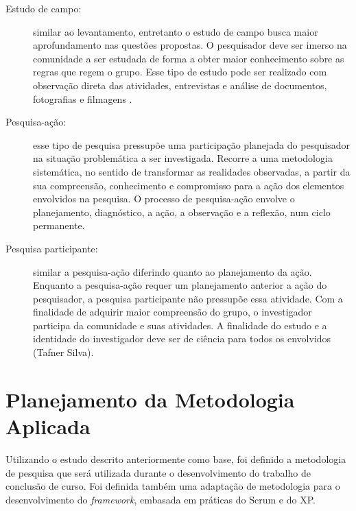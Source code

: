 \begin{description}
\item[Estudo de campo:] similar ao levantamento, entretanto o estudo de campo busca maior aprofundamento nas questões propostas. O pesquisador deve ser imerso na comunidade a ser estudada de forma a obter maior conhecimento sobre as regras que regem o grupo. Esse tipo de estudo pode ser realizado com observação direta das atividades, entrevistas e análise de documentos, fotografias e filmagens \cite{tafner_2007}. 

\item[Pesquisa-ação:] esse tipo de pesquisa pressupõe uma participação planejada do pesquisador na situação problemática a ser investigada. Recorre a uma metodologia sistemática, no sentido de transformar as realidades observadas, a partir da sua compreensão, conhecimento e compromisso para a ação dos elementos envolvidos na pesquisa. O processo de pesquisa-ação envolve o planejamento, diagnóstico, a ação, a observação e a reflexão, num ciclo permanente.

\item[Pesquisa participante:] similar a pesquisa-ação diferindo quanto ao planejamento da ação. Enquanto a pesquisa-ação requer um planejamento anterior a ação do pesquisador, a pesquisa participante não pressupõe essa atividade. Com a finalidade de adquirir maior compreensão do grupo, o investigador participa da comunidade e suas atividades. A finalidade do estudo e a identidade do investigador deve ser de ciência para todos os envolvidos (Tafner Silva).
\end{description}

 \section{Planejamento da Metodologia Aplicada}
  
Utilizando o estudo descrito anteriormente como base, foi definido a metodologia de pesquisa que será utilizada durante o desenvolvimento do trabalho de conclusão de curso.  Foi definida também uma adaptação de metodologia para o desenvolvimento do \textit{framework}, embasada em práticas do Scrum e do XP.  
  
